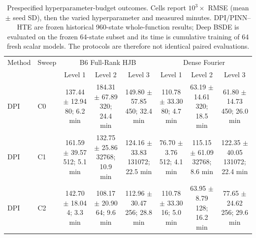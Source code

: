 \begin{table}[t]
\centering\scriptsize
\setlength{\tabcolsep}{2.5pt}
\caption{Prespecified hyperparameter-budget outcomes. Cells report $10^3\!\times$ RMSE (mean $\pm$ seed SD), then the varied hyperparameter and measured minutes. DPI/PINN--HTE are frozen historical 960-state whole-function results; Deep BSDE is evaluated on the frozen 64-state subset and its time is cumulative training of 64 fresh scalar models. The protocols are therefore not identical paired evaluations.}
\label{tab:deep-bsde-budget-scaling}
\begin{tabular}{llcccccc}
\toprule
Method & Sweep & \multicolumn{3}{c}{B6 Full-Rank HJB} & \multicolumn{3}{c}{Dense Fourier} \\
 & & Level 1 & Level 2 & Level 3 & Level 1 & Level 2 & Level 3 \\
\midrule
DPI & C0 & \shortstack{137.44 $\pm$ 12.94\\80; 6.2 min} & \shortstack{184.31 $\pm$ 67.89\\320; 24.4 min} & \shortstack{149.80 $\pm$ 57.85\\450; 32.4 min} & \shortstack{110.78 $\pm$ 33.30\\80; 4.7 min} & \shortstack{63.19 $\pm$ 14.61\\320; 18.5 min} & \shortstack{61.80 $\pm$ 14.73\\450; 26.0 min} \\
DPI & C1 & \shortstack{161.59 $\pm$ 39.57\\512; 5.1 min} & \shortstack{132.75 $\pm$ 25.86\\32768; 10.9 min} & \shortstack{124.16 $\pm$ 33.83\\131072; 22.5 min} & \shortstack{76.70 $\pm$ 3.76\\512; 4.1 min} & \shortstack{115.15 $\pm$ 61.09\\32768; 8.6 min} & \shortstack{122.35 $\pm$ 40.05\\131072; 22.4 min} \\
DPI & C2 & \shortstack{142.70 $\pm$ 18.04\\4; 3.3 min} & \shortstack{108.17 $\pm$ 20.90\\64; 9.6 min} & \shortstack{112.96 $\pm$ 30.47\\256; 28.8 min} & \shortstack{110.78 $\pm$ 33.30\\16; 5.0 min} & \shortstack{63.95 $\pm$ 8.79\\128; 16.2 min} & \shortstack{77.65 $\pm$ 24.62\\256; 29.6 min} \\

\end{tabular}
\end{table}
